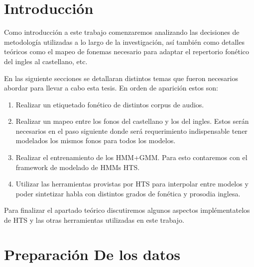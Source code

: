 \section{Introducción}

Como introducción a este trabajo comenzaremos analizando las decisiones de metodología utilizadas a lo largo de la investigación, así también como detalles teóricos como el mapeo de fonemas necesario para adaptar el repertorio fonético del ingles al castellano, etc.

En las siguiente secciones se detallaran distintos temas que fueron necesarios abordar para llevar a cabo esta tesis. En orden de aparición estos son:

\begin{enumerate}
\item Realizar un etiquetado fonético de distintos corpus de audios.

\item Realizar un mapeo entre los fonos del castellano y los del ingles. Estos serán necesarios en el paso siguiente donde será requerimiento indispensable tener modelados los mismos fonos para todos los modelos.

\item Realizar el entrenamiento de los HMM+GMM. Para esto contaremos con el framework de modelado de HMMs HTS. 

\item Utilizar las herramientas provistas por HTS para interpolar entre modelos y poder sintetizar habla con distintos grados de fonética y prosodia inglesa.

\end{enumerate}

Para finalizar el apartado teórico discutiremos algunos aspectos implémentatelos de HTS y las otras herramientas utilizadas en este trabajo.

\section{Preparación De los datos}



